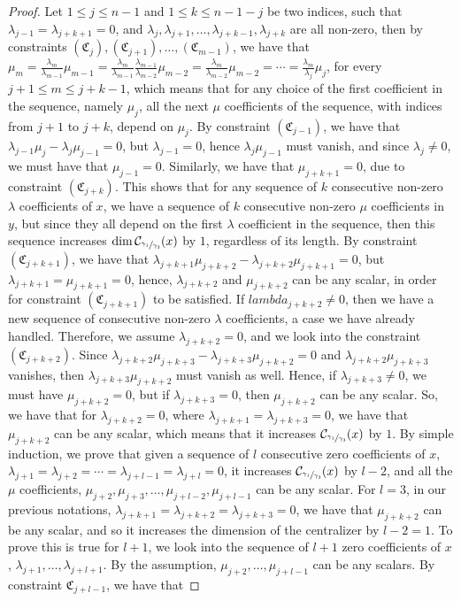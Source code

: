 \documentclass[12pt]{article}
\begin{document}
\begin{proof}
Let $1\leq j\leq n-1$ and $1\leq k\leq n-1-j$ be two indices, such that $\lambda_{j-1}=\lambda_{j+k+1}=0$, and $\lambda_j,\lambda_{j+1},\dots,\lambda_{j+k-1},\lambda_{j+k}$ are all non-zero, then by constraints $(\mathfrak{C}_j),(\mathfrak{C}_{j+1}),\dots,(\mathfrak{C}_{m-1})$, we have that $\mu_m=\frac{\lambda_m}{\lambda_{m-1}}\mu_{m-1}=\frac{\lambda_m}{\lambda_{m-1}}\frac{\lambda_{m-1}}{\lambda_{m-2}}\mu_{m-2}=\frac{\lambda_m}{\lambda_{m-2}}\mu_{m-2}=\cdots=\frac{\lambda_m}{\lambda_j}\mu_j$, for every $j+1\leq m\leq j+k-1$, which means that for any choice of the first coefficient in the sequence, namely $\mu_j$, all the next $\mu$ coefficients of the sequence, with indices from $j+1$ to $j+k$, depend on $\mu_j$. By constraint $(\mathfrak{C}_{j-1})$, we have that $\lambda_{j-1}\mu_j-\lambda_j\mu_{j-1}=0$, but $\lambda_{j-1}=0$, hence $\lambda_j\mu_{j-1}$ must vanish, and since $\lambda_j\neq 0$, we must have that $\mu_{j-1}=0$. Similarly, we have that $\mu_{j+k+1}=0$, due to constraint $(\mathfrak{C}_{j+k})$. This shows that for any sequence of $k$ consecutive non-zero $\lambda$ coefficients of $x$, we have a sequence of $k$ consecutive non-zero $\mu$ coefficients in $y$, but since they all depend on the first $\lambda$ coefficient in the sequence, then this sequence increases $\dim\mathcal{C}_{\sfrac{\gamma_1}{\gamma_3}}(x)$ by $1$, regardless of its length. By constraint $(\mathfrak{C}_{j+k+1})$, we have that $\lambda_{j+k+1}\mu_{j+k+2}-\lambda_{j+k+2}\mu_{j+k+1}=0$, but $\lambda_{j+k+1}=\mu_{j+k+1}=0$, hence, $\lambda_{j+k+2}$ and $\mu_{j+k+2}$ can be any scalar, in order for constraint $(\mathfrak{C}_{j+k+1})$ to be satisfied. If $lambda_{j+k+2}\neq 0$, then we have a new sequence of consecutive non-zero $\lambda$ coefficients, a case we have already handled. Therefore, we assume $\lambda_{j+k+2}=0$, and we look into the constraint $(\mathfrak{C}_{j+k+2})$. Since $\lambda_{j+k+2}\mu_{j+k+3}-\lambda_{j+k+3}\mu_{j+k+2}=0$ and $\lambda_{j+k+2}\mu_{j+k+3}$ vanishes, then                                                                                 $\lambda_{j+k+3}\mu_{j+k+2}$ must vanish as well. Hence, if $\lambda_{j+k+3}\neq 0$, we must have $\mu_{j+k+2}=0$, but if $\lambda_{j+k+3}=0$, then $\mu_{j+k+2}$ can be any scalar. So, we have that for $\lambda_{j+k+2}=0$, where $\lambda_{j+k+1}=\lambda_{j+k+3}=0$, we have that $\mu_{j+k+2}$ can be any scalar, which means that it increases $\mathcal{C}_{\sfrac{\gamma_1}{\gamma_3}}(x)$ by $1$. By simple induction, we prove that given a sequence of $l$ consecutive zero coefficients of $x$, $\lambda_{j+1}=\lambda_{j+2}=\cdots=\lambda_{j+l-1}=\lambda_{j+l}=0$, it increases $\mathcal{C}_{\sfrac{\gamma_1}{\gamma_3}}(x)$ by $l-2$, and all the $\mu$ coefficients, $\mu_{j+2},\mu_{j+3},\dots,\mu_{j+l-2},\mu_{j+l-1}$ can be any scalar. For $l=3$, in our previous notations, $\lambda_{j+k+1}=\lambda_{j+k+2}=\lambda_{j+k+3}=0$, we have that $\mu_{j+k+2}$ can be any scalar, and so it increases the dimension of the centralizer by $l-2=1$. To prove this is true for $l+1$, we look into the sequence of $l+1$ zero coefficients of $x$, $\lambda_{j+1},\dots,\lambda_{j+l+1}$. By the assumption, $\mu_{j+2},\dots,\mu_{j+l-1}$ can be any scalars. By constraint $\mathfrak{C}_{j+l-1}$, we have that 
\end{proof}
\end{document}
